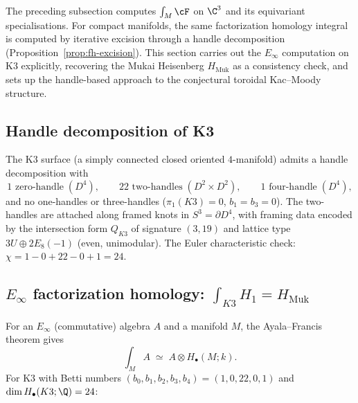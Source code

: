 The preceding subsection computes $\int_M \cF$ on $\C^3$ and its equivariant specialisations.
For compact manifolds, the same factorization homology integral is computed by iterative excision through a handle decomposition (Proposition~\ref{prop:fh-excision}).
This section carries out the $E_\infty$ computation on K3 explicitly, recovering the Mukai Heisenberg $H_{\mathrm{Muk}}$ as a consistency check, and sets up the handle-based approach to the conjectural toroidal Kac--Moody structure.

\subsection{Handle decomposition of K3}
\label{subsec:handle-k3}

\begin{proposition}
\label{prop:handle-decomposition-k3}
The K3 surface (a simply connected closed oriented $4$-manifold) admits a handle decomposition with
\[
 1 \text{ zero-handle}\; (D^4),
 \qquad
 22 \text{ two-handles}\; (D^2 \times D^2),
 \qquad
 1 \text{ four-handle}\; (D^4),
\]
and no one-handles or three-handles ($\pi_1(K3) = 0$, $b_1 = b_3 = 0$).
The two-handles are attached along framed knots in $S^3 = \partial D^4$, with framing data encoded by the intersection form $Q_{K3}$ of signature $(3, 19)$ and lattice type $3U \oplus 2E_8(-1)$ (even, unimodular).
The Euler characteristic check: $\chi = 1 - 0 + 22 - 0 + 1 = 24$.
\end{proposition}

\subsection{\texorpdfstring{$E_\infty$}{E-inf} factorization homology: \texorpdfstring{$\int_{K3} H_1 = H_{\mathrm{Muk}}$}{int-K3 H-1 = H-Muk}}
\label{subsec:einf-fh-k3}

For an $E_\infty$ (commutative) algebra $A$ and a manifold $M$, the Ayala--Francis theorem gives
\begin{equation}\label{eq:einf-fh-general}
 \int_M A \;\simeq\; A \otimes H_\bullet(M; k).
\end{equation}
For K3 with Betti numbers $(b_0, b_1, b_2, b_3, b_4) = (1, 0, 22, 0, 1)$ and $\dim H_\bullet(K3; \Q) = 24$:

